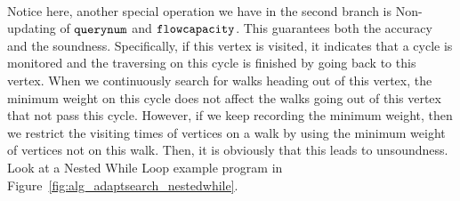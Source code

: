 %
\\
Notice here, another special operation we have in the second branch is Non-updating of
$\mathtt{querynum}$ and $\mathtt{flowcapacity}$.
This guarantees both the accuracy and the soundness.
Specifically,
if this vertex is visited, it indicates that a cycle is monitored and  
the traversing on this cycle is finished by going back to this vertex.
%
When we continuously search for walks heading out of this vertex, 
the minimum weight on this cycle does not affect the walks going out of this vertex that not pass this cycle.
However, if we keep recording the minimum weight, then we
restrict the visiting times of vertices on a walk by
 using the minimum weight of vertices not on this walk.
Then, it is obviously that this leads to unsoundness.
 Look at a Nested While Loop example program in Figure~\ref{fig:alg_adaptsearch_nestedwhile}.
